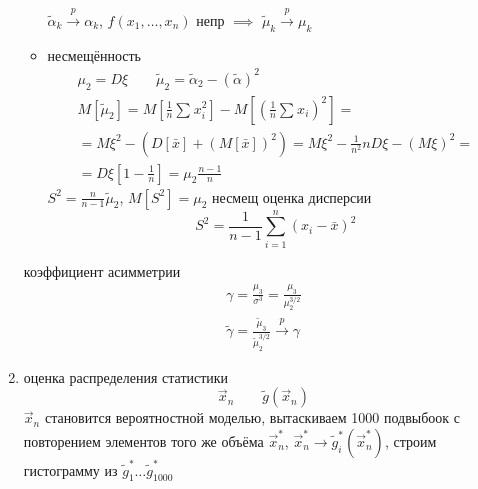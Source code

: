 \documentclass{article}
\begin{document}
\begin{enumerate}
\begin{itemize}
        $\tilde{\alpha}_k \overset{p}{\to} \alpha_k$, $f(x_1,\dots ,x_n)$ непр $\implies$
        $\tilde{\mu}_k \overset{p}{\to} \mu_k$ 
      \item несмещённость 
        \begin{gather*}
          \mu_2=D\xi \qquad \tilde{\mu}_2=\tilde{\alpha}_2 - (\tilde{\alpha})^{2} \\ 
          M[\tilde{\mu}_2]
          =M\left[\frac{1}{n}\sum_{}^{}x_i^{2}\right]-M\left[(\frac{1}{n}\sum_{}^{}x_i)^{2}\right] = \\
          = M\xi^{2}-(D[\bar{x}]+(M[\bar{x}])^{2})
          = M\xi^{2}-\frac{1}{n^{2}}nD\xi - (M\xi)^{2}= \\
          = D\xi \left[1-\frac{1}{n}\right]=\mu_2\frac{n-1}{n}
        \end{gather*}
        $S^{2}=\frac{n}{n-1}\tilde{\mu}_2$, $M[S^{2}]=\mu_2$ несмещ оценка дисперсии
        \[
          S^{2}=\frac{1}{n-1}\sum_{i=1}^{n}(x_i-\bar{x})^{2}
        \]
    \end{itemize}
    \hr
    коэффициент асимметрии
    \begin{gather*}
      \gamma=\frac{\mu_3}{\sigma^{3}}=\frac{\mu_3}{\mu_2^{3/2}} \\ 
      \tilde{\gamma}=\frac{\tilde{\mu}_3}{\tilde{\mu}_2^{3/2}} \overset{p}{\to}\gamma
    \end{gather*}
  \item оценка распределения статистики
    \[
      \vec{x}_n \qquad \tilde{g}(\vec{x}_n)
    \]
    $\vec{x}_n$ становится вероятностной моделью,
    вытаскиваем 1000 подвыбоок с повторением элементов того же объёма $\vec{x}_n^{*}$,
    $\vec{x}_n^{*} \rightarrow \tilde{g}_i^{*}(\vec{x}_n^{*})$,
    строим гистограмму из $\tilde{g}_1^{*}\dots \tilde{g}_{10 0 0}^{*}$
\end{enumerate}
\end{document}
